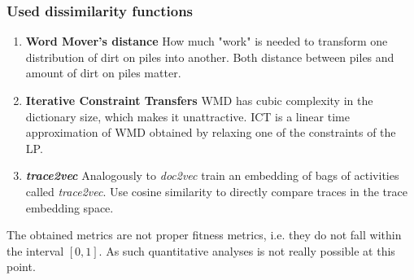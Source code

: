 \documentclass{beamer}
\begin{document}
	
	\begin{frame}
		\frametitle{Used dissimilarity functions}
		\begin{enumerate}
			\item \textbf{Word Mover's distance} How much "work" is needed to transform one distribution of dirt on piles into another. Both distance between piles and amount of dirt on piles matter.
			\item \textbf{Iterative Constraint Transfers} WMD has cubic complexity in the dictionary size, which makes it unattractive. ICT is a linear time approximation of WMD obtained by relaxing one of the constraints of the LP.
			\item \textbf{\emph{trace2vec}} Analogously to \emph{doc2vec} train an embedding of bags of activities called \emph{trace2vec}. Use cosine similarity to directly compare traces in the trace embedding space.
		\end{enumerate}
	\alert{The obtained metrics are not proper fitness metrics, i.e. they do not fall within the interval $[0,1]$. As such quantitative analyses is not really possible at this point.}
	\end{frame}
	
\end{document}

